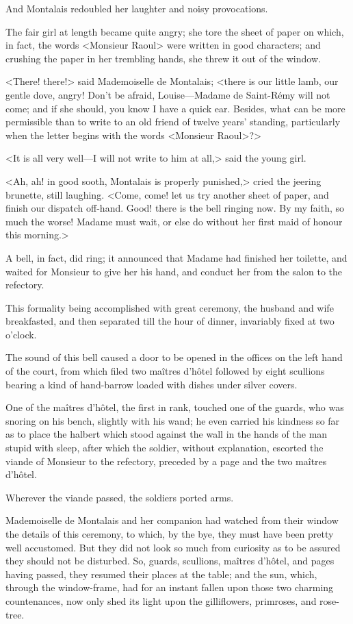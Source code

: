 And Montalais redoubled her laughter and noisy provocations.

The fair girl at length became quite angry; she tore the sheet of paper on which, in fact, the words <Monsieur Raoul> were written in good characters; and crushing the paper in her trembling hands, she threw it out of the window.

<There! there!> said Mademoiselle de Montalais; <there is our little lamb, our gentle dove, angry! Don't be afraid, Louise—Madame de Saint-Rémy will not come; and if she should, you know I have a quick ear. Besides, what can be more permissible than to write to an old friend of twelve years' standing, particularly when the letter begins with the words <Monsieur Raoul>?>

<It is all very well—I will not write to him at all,> said the young girl.

<Ah, ah! in good sooth, Montalais is properly punished,> cried the jeering brunette, still laughing. <Come, come! let us try another sheet of paper, and finish our dispatch off-hand. Good! there is the bell ringing now. By my faith, so much the worse! Madame must wait, or else do without her first maid of honour this morning.>

A bell, in fact, did ring; it announced that Madame had finished her toilette, and waited for Monsieur to give her his hand, and conduct her from the salon to the refectory.

This formality being accomplished with great ceremony, the husband and wife breakfasted, and then separated till the hour of dinner, invariably fixed at two o'clock.

The sound of this bell caused a door to be opened in the offices on the left hand of the court, from which filed two maîtres d'hôtel followed by eight scullions bearing a kind of hand-barrow loaded with dishes under silver covers.

One of the maîtres d'hôtel, the first in rank, touched one of the guards, who was snoring on his bench, slightly with his wand; he even carried his kindness so far as to place the halbert which stood against the wall in the hands of the man stupid with sleep, after which the soldier, without explanation, escorted the viande of Monsieur to the refectory, preceded by a page and the two maîtres d'hôtel.

Wherever the viande passed, the soldiers ported arms.

Mademoiselle de Montalais and her companion had watched from their window the details of this ceremony, to which, by the bye, they must have been pretty well accustomed. But they did not look so much from curiosity as to be assured they should not be disturbed. So, guards, scullions, maîtres d'hôtel, and pages having passed, they resumed their places at the table; and the sun, which, through the window-frame, had for an instant fallen upon those two charming countenances, now only shed its light upon the gilliflowers, primroses, and rose-tree.

